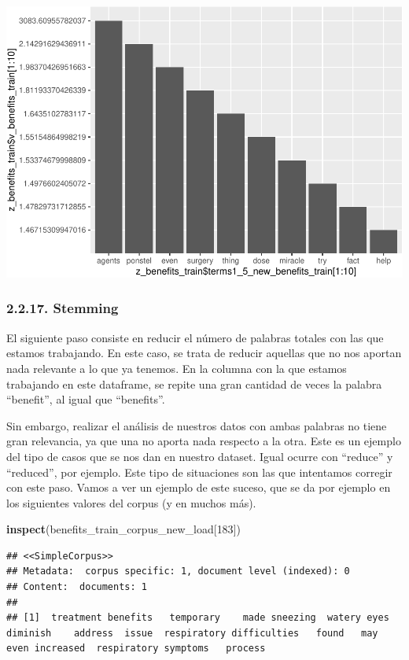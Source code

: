 \documentclass[spanish,]{article}
\newenvironment{Shaded}{\begin{snugshade}}{\end{snugshade}}
\newcommand{\KeywordTok}[1]{\textcolor[rgb]{0.13,0.29,0.53}{\textbf{#1}}}
\newcommand{\DecValTok}[1]{\textcolor[rgb]{0.00,0.00,0.81}{#1}}
\newcommand{\NormalTok}[1]{#1}
\begin{document}
\includegraphics{practica-original_files/figure-latex/unnamed-chunk-60-1.pdf}

\subsubsection{2.2.17. Stemming}\label{stemming}

El siguiente paso consiste en reducir el número de palabras totales con
las que estamos trabajando. En este caso, se trata de reducir aquellas
que no nos aportan nada relevante a lo que ya tenemos. En la columna con
la que estamos trabajando en este dataframe, se repite una gran cantidad
de veces la palabra ``benefit'', al igual que ``benefits''.

Sin embargo, realizar el análisis de nuestros datos con ambas palabras
no tiene gran relevancia, ya que una no aporta nada respecto a la otra.
Este es un ejemplo del tipo de casos que se nos dan en nuestro dataset.
Igual ocurre con ``reduce'' y ``reduced'', por ejemplo. Este tipo de
situaciones son las que intentamos corregir con este paso. Vamos a ver
un ejemplo de este suceso, que se da por ejemplo en los siguientes
valores del corpus (y en muchos más).

\begin{Shaded}
\begin{Highlighting}[]
\KeywordTok{inspect}\NormalTok{(benefits_train_corpus_new_load[}\DecValTok{183}\NormalTok{])}
\end{Highlighting}
\end{Shaded}

\begin{verbatim}
## <<SimpleCorpus>>
## Metadata:  corpus specific: 1, document level (indexed): 0
## Content:  documents: 1
## 
## [1]  treatment benefits   temporary    made sneezing  watery eyes diminish    address  issue  respiratory difficulties   found   may  even increased  respiratory symptoms   process
\end{verbatim}
\end{document}
